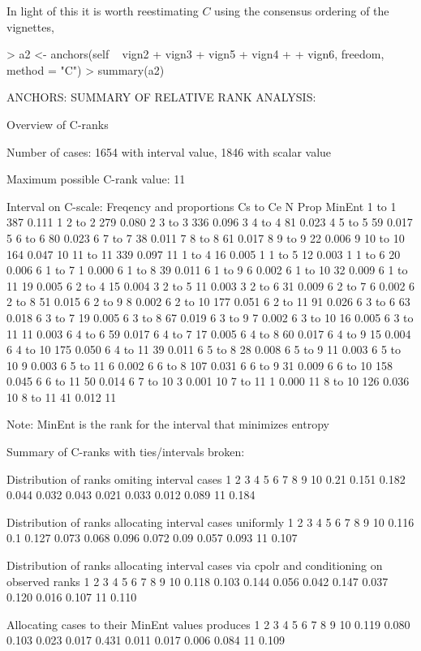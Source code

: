 \documentclass{amsart}
\begin{document}
In light of this it is worth reestimating $C$ using the consensus
ordering of the vignettes,
\begin{Schunk}
\begin{Sinput}
> a2 <- anchors(self ~ vign2 + vign3 + vign5 + vign4 + 
+     vign6, freedom, method = "C")
> summary(a2)
\end{Sinput}
\begin{Soutput}
ANCHORS: SUMMARY OF RELATIVE RANK ANALYSIS:

Overview of C-ranks

Number of cases: 1654 with interval value, 1846 with scalar value

Maximum possible C-rank value: 11

Interval on C-scale: Freqency and proportions Cs to Ce
           N  Prop MinEnt
 1 to  1 387 0.111      1
 2 to  2 279 0.080      2
 3 to  3 336 0.096      3
 4 to  4  81 0.023      4
 5 to  5  59 0.017      5
 6 to  6  80 0.023      6
 7 to  7  38 0.011      7
 8 to  8  61 0.017      8
 9 to  9  22 0.006      9
10 to 10 164 0.047     10
11 to 11 339 0.097     11
 1 to  4  16 0.005      1
 1 to  5  12 0.003      1
 1 to  6  20 0.006      6
 1 to  7   1 0.000      6
 1 to  8  39 0.011      6
 1 to  9   6 0.002      6
 1 to 10  32 0.009      6
 1 to 11  19 0.005      6
 2 to  4  15 0.004      3
 2 to  5  11 0.003      3
 2 to  6  31 0.009      6
 2 to  7   6 0.002      6
 2 to  8  51 0.015      6
 2 to  9   8 0.002      6
 2 to 10 177 0.051      6
 2 to 11  91 0.026      6
 3 to  6  63 0.018      6
 3 to  7  19 0.005      6
 3 to  8  67 0.019      6
 3 to  9   7 0.002      6
 3 to 10  16 0.005      6
 3 to 11  11 0.003      6
 4 to  6  59 0.017      6
 4 to  7  17 0.005      6
 4 to  8  60 0.017      6
 4 to  9  15 0.004      6
 4 to 10 175 0.050      6
 4 to 11  39 0.011      6
 5 to  8  28 0.008      6
 5 to  9  11 0.003      6
 5 to 10   9 0.003      6
 5 to 11   6 0.002      6
 6 to  8 107 0.031      6
 6 to  9  31 0.009      6
 6 to 10 158 0.045      6
 6 to 11  50 0.014      6
 7 to 10   3 0.001     10
 7 to 11   1 0.000     11
 8 to 10 126 0.036     10
 8 to 11  41 0.012     11

Note: MinEnt is the rank for the interval that minimizes entropy

Summary of C-ranks with ties/intervals broken:

Distribution of ranks omiting interval cases
    1     2     3     4     5     6     7     8     9    10
 0.21 0.151 0.182 0.044 0.032 0.043 0.021 0.033 0.012 0.089
    11
 0.184

Distribution of ranks allocating interval cases uniformly
     1   2     3     4     5     6     7    8     9    10
 0.116 0.1 0.127 0.073 0.068 0.096 0.072 0.09 0.057 0.093
    11
 0.107

Distribution of ranks allocating interval cases via cpolr
and conditioning on observed ranks
    1     2     3     4     5     6     7     8     9    10 
0.118 0.103 0.144 0.056 0.042 0.147 0.037 0.120 0.016 0.107 
   11 
0.110 

Allocating cases to their MinEnt values produces
    1     2     3     4     5     6     7     8     9    10 
0.119 0.080 0.103 0.023 0.017 0.431 0.011 0.017 0.006 0.084 
   11 
0.109 
\end{Soutput}
\end{Schunk}
\end{document}
